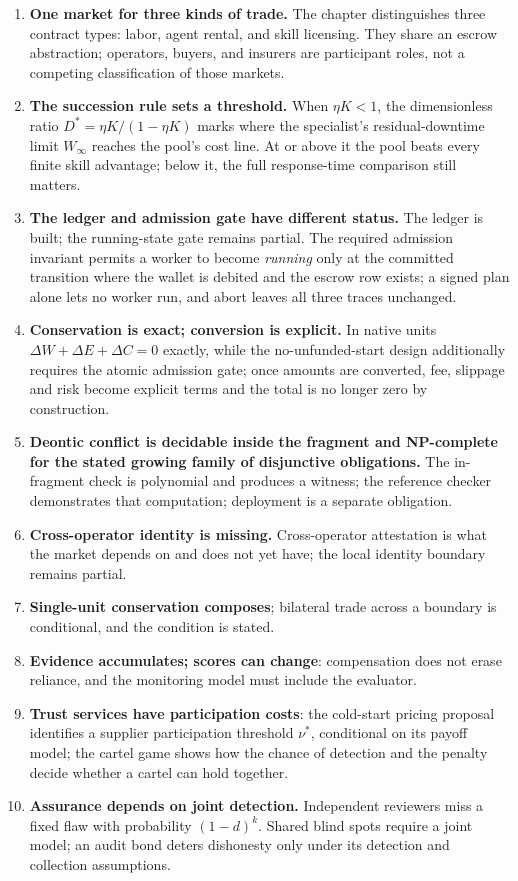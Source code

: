 \documentclass[11pt,a4paper]{article}
\theoremstyle{definition}
\theoremstyle{definition}
\theoremstyle{remark}
\begin{document}
\begin{enumerate}[leftmargin=1.6em,itemsep=2pt]
\item \textbf{One market for three kinds of trade.} The chapter distinguishes three contract types: labor, agent rental, and skill licensing. They share an escrow abstraction; operators, buyers, and insurers are participant roles, not a competing classification of those markets.
\item \textbf{The succession rule sets a threshold.} When $\eta K<1$, the dimensionless ratio $D^{\ast}=\eta K/(1-\eta K)$
marks where the specialist's residual-downtime limit $W_\infty$ reaches the pool's cost
line. At or above it the pool beats every finite skill advantage; below it,
the full response-time comparison still matters.
\item \textbf{The ledger and admission gate have different status.} The ledger is built; the running-state gate remains partial. The required admission invariant permits a worker to become \emph{running} only at the committed transition where the wallet is debited and the escrow row exists; a signed plan alone lets no worker run, and abort leaves all three traces unchanged.
\item \textbf{Conservation is exact; conversion is explicit.} In native units $\Delta W+\Delta E+\Delta C=0$ exactly, while the no-unfunded-start design additionally requires the atomic admission gate; once amounts are converted, fee, slippage and risk become explicit terms and the total is no longer zero by construction.
\item \textbf{Deontic conflict is decidable inside the fragment and NP-complete for the stated growing family of disjunctive obligations.} The in-fragment check is polynomial and produces a witness; the reference checker demonstrates that computation; deployment is a separate obligation.
\item \textbf{Cross-operator identity is missing.} Cross-operator attestation is what the market depends on and does not yet have; the local identity boundary remains partial.
\item \textbf{Single-unit conservation composes}; bilateral trade across a boundary is conditional, and the condition is stated.
\item \textbf{Evidence accumulates; scores can change}: compensation does not erase reliance, and the monitoring model must include the evaluator.
\item \textbf{Trust services have participation costs}: the cold-start pricing proposal identifies a supplier participation threshold $\nu^{\ast}$, conditional on its payoff model; the cartel game shows how the chance of detection and the penalty decide whether a cartel can hold together.
\item \textbf{Assurance depends on joint detection.} Independent reviewers
miss a fixed flaw with probability $(1-d)^k$. Shared blind spots require a
joint model; an audit bond deters dishonesty only under its detection and
collection assumptions.
\end{enumerate}
\end{document}
